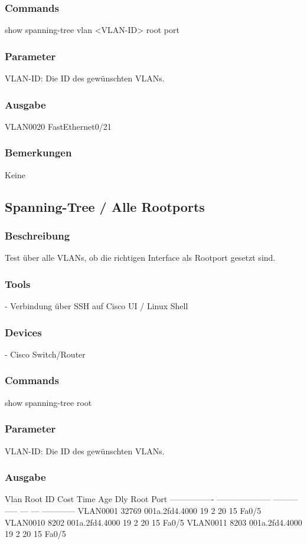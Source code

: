 \documentclass[a4,12pt]{scrartcl}
\begin{document}
\subsubsection{Commands}
show spanning-tree vlan <VLAN-ID> root port
\subsubsection{Parameter}
VLAN-ID: Die ID des gewünschten VLANs.
\subsubsection{Ausgabe}
VLAN0020         FastEthernet0/21
\subsubsection{Bemerkungen}
Keine


\subsection{Spanning-Tree / Alle Rootports}
\subsubsection{Beschreibung}
Test über alle VLANs, ob die richtigen Interface als Rootport gesetzt sind.
\subsubsection{Tools}
- Verbindung über SSH auf Cisco UI / Linux Shell
\subsubsection{Devices}
- Cisco Switch/Router
\subsubsection{Commands}
show spanning-tree root
\subsubsection{Parameter}
VLAN-ID: Die ID des gewünschten VLANs.
\subsubsection{Ausgabe}
Vlan                   Root ID          Cost    Time  Age Dly  Root Port\newline
---------------- -------------------- --------- ----- --- ---  ------------\newline
VLAN0001         32769 001a.2fd4.4000        19    2   20  15  Fa0/5\newline
VLAN0010          8202 001a.2fd4.4000        19    2   20  15  Fa0/5\newline
VLAN0011          8203 001a.2fd4.4000        19    2   20  15  Fa0/5\newline
\end{document}
